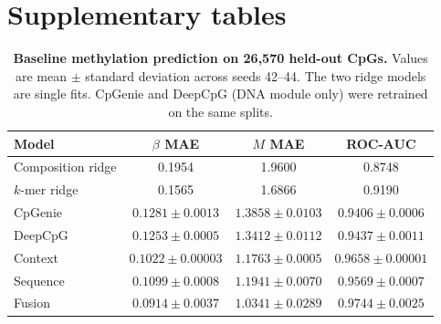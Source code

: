 \documentclass[11pt,letterpaper]{article}
\begin{document}
\vspace{-0.6em}\section*{Supplementary tables}

\begin{table}[H]
\centering
\caption{\textbf{Baseline methylation prediction on 26,570 held-out CpGs.} Values are mean $\pm$ standard deviation across seeds 42--44. The two ridge models are single fits. CpGenie and DeepCpG (DNA module only) were retrained on the same splits.}
\label{tab:s1}
\small
\begin{tabular}{lccc}
\toprule
Model & $\beta$ MAE & $M$ MAE & ROC-AUC\\
\midrule
Composition ridge & 0.1954 & 1.9600 & 0.8748\\
$k$-mer ridge & 0.1565 & 1.6866 & 0.9190\\
CpGenie & $0.1281\pm0.0013$ & $1.3858\pm0.0103$ & $0.9406\pm0.0006$\\
DeepCpG & $0.1253\pm0.0005$ & $1.3412\pm0.0112$ & $0.9437\pm0.0011$\\
Context & $0.1022\pm0.00003$ & $1.1763\pm0.0005$ & $0.9658\pm0.00001$\\
Sequence & $0.1099\pm0.0008$ & $1.1941\pm0.0070$ & $0.9569\pm0.0007$\\
Fusion & $0.0914\pm0.0037$ & $1.0341\pm0.0289$ & $0.9744\pm0.0025$\\
\bottomrule
\end{tabular}
\end{table}
\end{document}
